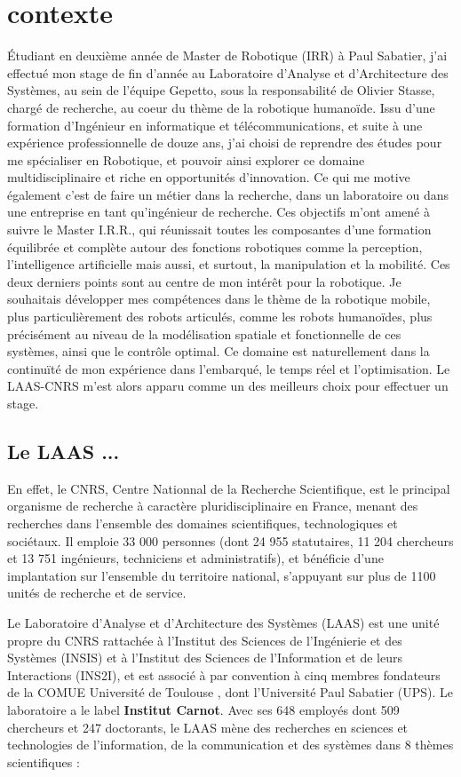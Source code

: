 \documentclass{report}
\begin{document}
\section*{contexte}

\'{E}tudiant en deuxième année de Master de Robotique (IRR) à Paul Sabatier, j'ai effectué mon stage de fin d'année au Laboratoire d'Analyse et d'Architecture des Systèmes, au sein de l'équipe Gepetto, sous la responsabilité de Olivier Stasse, chargé de recherche, au coeur du thème de la robotique humanoïde. Issu d'une formation d'Ingénieur en informatique et télécommunications, et suite à une expérience professionnelle de douze ans, j'ai choisi de reprendre des études pour me spécialiser en Robotique, et pouvoir ainsi explorer ce domaine multidisciplinaire et riche en opportunités d'innovation. Ce qui me motive également c'est de faire un métier dans la recherche, dans un laboratoire ou dans une entreprise en tant qu'ingénieur de recherche. Ces objectifs m'ont amené à suivre le Master I.R.R., qui réunissait toutes les composantes d'une formation équilibrée et complète autour des fonctions robotiques comme la perception, l'intelligence artificielle mais aussi, et surtout, la manipulation et la mobilité. Ces deux derniers points sont au centre de mon intérêt pour la robotique. Je souhaitais développer mes compétences dans le thème de la robotique mobile, plus particulièrement des robots articulés, comme les robots humanoïdes, plus précisément au niveau de la modélisation spatiale et fonctionnelle de ces systèmes, ainsi que le contrôle optimal. Ce domaine est naturellement dans la continuïté de mon expérience dans l'embarqué, le temps réel et l'optimisation. Le LAAS-CNRS m'est alors apparu comme un des meilleurs choix pour effectuer un stage.

\subsection*{Le LAAS ...}
En effet, le CNRS, Centre Nationnal de la Recherche Scientifique, est le principal organisme de recherche à caractère pluridisciplinaire en France, menant des recherches dans l'ensemble des domaines scientifiques, technologiques et sociétaux. Il emploie 33 000 personnes (dont 24 955 statutaires, 11 204 chercheurs et 13 751 ingénieurs, techniciens et administratifs), et bénéficie d'une implantation sur l'ensemble du territoire national, s'appuyant sur plus de 1100 unités de recherche et de service.

Le Laboratoire d’Analyse et d’Architecture des Systèmes (LAAS) est une unité propre du CNRS rattachée à l’Institut des Sciences de l'Ingénierie et des Systèmes (INSIS) et à l'Institut des Sciences de l'Information et de leurs Interactions (INS2I), et est associé à par convention à cinq membres fondateurs de la COMUE \og Université de Toulouse \fg{}, dont l'Université Paul Sabatier (UPS). Le laboratoire a le label \textbf{Institut Carnot}. Avec ses 648 employés dont 509 chercheurs et 247 doctorants, le LAAS mène des recherches en sciences et technologies de l’information, de la communication et des systèmes dans 8 thèmes scientifiques :
\end{document}
